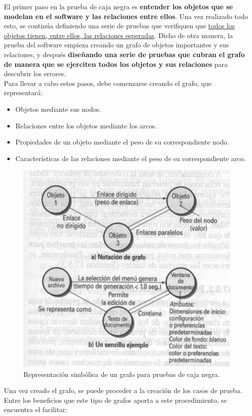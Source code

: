 El primer paso en la prueba de caja negra es \textbf{entender los objetos que se modelan en el software y las relaciones entre ellos}. Una vez realizado todo esto, se continúa definiendo una serie de pruebas que verifiquen que \uline{todos los objetos tienen, entre ellos, las relaciones esperadas}. Dicho de otra manera, la prueba del software empieza creando un grafo de objetos importantes y sus relaciones, y después \textbf{diseñando una serie de pruebas que cubran el grafo de manera que se ejerciten todos los objetos y sus relaciones} para descubrir los errores.\\

Para llevar a cabo estos pasos, debe comenzarse creando el grafo, que representará:

\begin{itemize}
    \item Objetos mediante sus nodos.
    \item Relaciones entre los objetos mediante los arcos.
    \item Propiedades de un objeto mediante el peso de su correspondiente nodo.
    \item Características de las relaciones mediante el peso de su correspondiente arco.
\end{itemize}

\begin{figure}[H]
    \centering
    \includegraphics[width=0.5\linewidth]{Resources/Tema6/Ejemplo_Grafo.png}
    \caption{Representación simbólica de un grafo para pruebas de caja negra.}
    \label{fig:estrategiasPruebas}
\end{figure}

Una vez creado el grafo, se puede proceder a la creación de los casos de prueba. Entre los beneficios que este tipo de grafos aporta a este procedimiento, se encuentra el facilitar:

